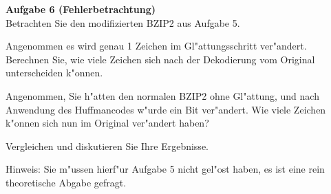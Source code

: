 \documentclass[a4paper]{article}
\begin{document}
\bigskip

{\bf Aufgabe 6  \quad(Fehlerbetrachtung)}\\
Betrachten Sie den modifizierten BZIP2 aus Aufgabe 5.

Angenommen es wird genau 1 Zeichen im Gl"attungsschritt ver"andert. Berechnen
Sie, wie viele Zeichen sich nach der Dekodierung vom Original unterscheiden
k"onnen.

Angenommen, Sie h"atten den normalen BZIP2 ohne Gl"attung, und nach Anwendung
des Huffmancodes w"urde ein Bit ver"andert. Wie viele Zeichen k"onnen sich
nun im Original ver"andert haben?

Vergleichen und diskutieren Sie Ihre Ergebnisse.

Hinweis: Sie m"ussen hierf"ur Aufgabe 5 nicht gel"ost haben, es ist eine rein
theoretische Abgabe gefragt.
\end{document}
